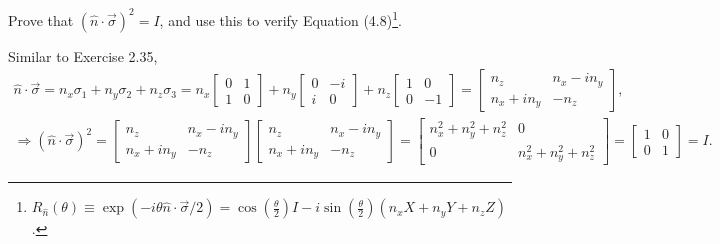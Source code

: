 \documentclass[en]{sol-man}
\begin{document}
\begin{exe}
    Prove that $(\hat{n}\cdot\vec{\sigma})^2=I$, and use this to verify Equation (4.8)\footnote{$R_{\hat{n}}(\theta)\equiv\exp(-i\theta\hat{n}\cdot\vec{\sigma}/2)=\cos\left(\frac{\theta}{2}\right)I-i\sin\left(\frac{\theta}{2}\right)(n_xX+n_yY+n_zZ)$.}.
\end{exe}
\begin{pf}
    Similar to Exercise 2.35,
    \begin{gather}
        \hat{n}\cdot\vec{\sigma}=n_x\sigma_1+n_y\sigma_2+n_z\sigma_3=n_x\left[\begin{matrix}
            0&1\\
            1&0
        \end{matrix}\right]+n_y\left[\begin{matrix}
            0&-i\\
            i&0
        \end{matrix}\right]+n_z\left[\begin{matrix}
            1&0\\
            0&-1
        \end{matrix}\right]=\left[\begin{matrix}
            n_z&n_x-in_y\\
            n_x+in_y&-n_z
        \end{matrix}\right],\\
        \Longrightarrow(\hat{n}\cdot\vec{\sigma})^2=\left[\begin{matrix}
            n_z&n_x-in_y\\
            n_x+in_y&-n_z
        \end{matrix}\right]\left[\begin{matrix}
            n_z&n_x-in_y\\
            n_x+in_y&-n_z
        \end{matrix}\right]=\left[\begin{matrix}
            n_x^2+n_y^2+n_z^2&0\\
            0&n_x^2+n_y^2+n_z^2
        \end{matrix}\right]=\left[\begin{matrix}
            1&0\\
            0&1
        \end{matrix}\right]=I.
    \end{gather}


\end{pf}
\end{document}
